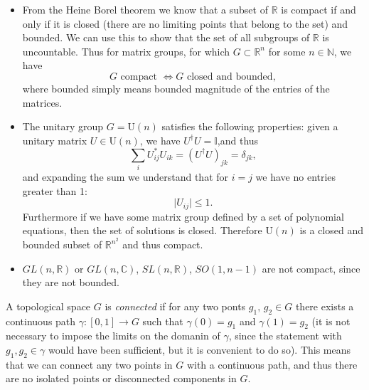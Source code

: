 \begin{example}
    \begin{itemize}
        \item From the Heine Borel theorem we know that a subset of $\mathbb{R}$ is compact if and only if it is closed (there are no limiting points that belong to the set) and bounded. We can use this to show that the set of all subgroups of $\mathbb{R}$ is uncountable. Thus for matrix groups, for which \(G \subset \mathbb{R}^{n}\) for some \(n \in \mathbb{N}\), we have
              \[
                  G \text{ compact } \iff G \text{ closed and bounded},
              \]
              where bounded simply means bounded magnitude of the entries of the matrices.

        \item The unitary group \(G = \mathrm{U}(n)\) satisfies the following properties: given a unitary matrix \(U \in \mathrm{U}(n)\), we have \(U^{\dagger} U = \mathbb{I}\),and thus
              \[
                  \sum_{i} U^*_{ij} U_{ik} = (U^{\dagger}U)_{jk} = \delta_{jk},
              \]
              and expanding the sum we understand that for \(i=j\) we have no entries greater than 1:
              \[
                  \vert U_{ij} \vert \leq 1.
              \]
              Furthermore if we have some matrix group defined by a set of polynomial equations, then the set of solutions is closed. Therefore \(\mathrm{U}(n)\) is a closed and bounded subset of \(\mathbb{R}^{n^2}\) and thus compact.

        \item \(GL(n,\mathbb{R})\) or \(GL(n,\mathbb{C})\), \(SL(n,\mathbb{R})\), \(SO(1,n-1)\) are not compact, since they are not bounded.
    \end{itemize}
\end{example}

\begin{definition}
    A topological space \(G\) is \textit{connected} if for any two ponts \(g_1,\,g_2 \in G\) there exists a continuous path \(\gamma : [0,1] \to G\) such that \(\gamma(0) = g_1\) and \(\gamma(1) = g_2\) (it is not necessary to impose the limits on the domanin of \(\gamma\), since the statement with \(g_1,g_2 \in \gamma\) would have been sufficient, but it is convenient to do so). This means that we can connect any two points in \(G\) with a continuous path, and thus there are no isolated points or disconnected components in \(G\).
\end{definition}

